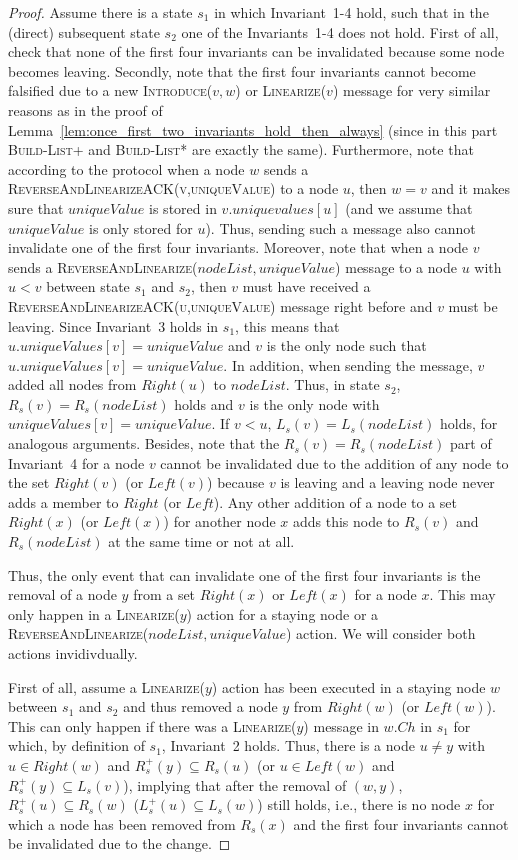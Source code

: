 \documentclass[a4paper,USenglish]{lipics}
\newcommand{\blp}{\textsc{Build-List+}\xspace}
\newcommand{\blpp}{\textsc{Build-List*}\xspace}
\newcommand{\linearize}[1]{\textsc{Linearize(\ensuremath{#1})}\xspace}
\newcommand{\introduce}[1]{\textsc{Introduce(\ensuremath{#1})}\xspace}
\newcommand{\rsp}{\ensuremath{R_s^+}\xspace}
\newcommand{\lsp}{\ensuremath{L_s^+}\xspace}
\newcommand{\revandlin}[1]{\textsc{ReverseAndLinearize(\ensuremath{#1})}\xspace} \newcommand{\revandlinREQ}[1]{\textsc{ReverseAndLinearizeREQ(#1)}\xspace}
\newcommand{\revandlinACK}[1]{\textsc{ReverseAndLinearizeACK(#1)}\xspace}
\begin{document}
\begin{proof}
 Assume there is a state $s_1$ in which Invariant~1-4 hold, such that in the (direct) subsequent state $s_2$ one of the Invariants~1-4 does not hold.
 First of all, check that none of the first four invariants can be invalidated because some node becomes leaving.
 Secondly, note that the first four invariants cannot become falsified due to a new \introduce{v,w} or \linearize{v} message for very similar reasons as in the proof of Lemma~\ref{lem:once_first_two_invariants_hold_then_always} (since in this part \blp and \blpp are exactly the same).
 Furthermore, note that according to the protocol when a node $w$ sends a \revandlinACK{v,uniqueValue} to a node $u$, then $w=v$ and it makes sure that $uniqueValue$ is stored in $v.uniquevalues[u]$ (and we assume that $uniqueValue$ is only stored for $u$).
 Thus, sending such a message also cannot invalidate one of the first four invariants.
 Moreover, note that when a node $v$ sends a \revandlin{nodeList,uniqueValue} message to a node $u$ with $u < v$ between state $s_1$ and $s_2$, then $v$ must have received a \revandlinACK{u,uniqueValue} message right before and $v$ must be leaving.
 Since Invariant~3 holds in $s_1$, this means that $u.uniqueValues[v] = uniqueValue$ and $v$ is the only node such that $u.uniqueValues[v] = uniqueValue$.
 In addition, when sending the message, $v$ added all nodes from $Right(u)$ to $nodeList$.
 Thus, in state $s_2$, $R_s(v) = R_s(nodeList)$ holds and $v$ is the only node with $uniqueValues[v] = uniqueValue$.
 If $v < u$, $L_s(v) = L_s(nodeList)$ holds, for analogous arguments.
 Besides, note that the $R_s(v) = R_s(nodeList)$ part of Invariant~4 for a node $v$ cannot be invalidated due to the addition of any node to the set $Right(v)$ (or $Left(v)$) because $v$ is leaving and a leaving node never adds a member to $Right$ (or $Left$).
 Any other addition of a node to a set $Right(x)$ (or $Left(x)$) for another node $x$ adds this node to $R_s(v)$ and $R_s(nodeList)$ at the same time or not at all.
 
 Thus, the only event that can invalidate one of the first four invariants is the removal of a node $y$ from a set $Right(x)$ or $Left(x)$ for a node $x$.
 This may only happen in a \linearize{y} action for a staying node or a \revandlin{nodeList, uniqueValue} action.
    We will consider both actions invidivdually.
    
    First of all, assume a \linearize{y} action has been executed in a staying node $w$ between $s_1$ and $s_2$ and thus removed a node $y$ from $Right(w)$ (or $Left(w)$).
    This can only happen if there was a \linearize{y} message in $w.Ch$ in $s_1$ for which, by definition of $s_1$, Invariant~2 holds.
    Thus, there is a node $u \neq y$ with $u \in Right(w)$ and $\rsp(y) \subseteq R_s(u)$ (or $u \in Left(w)$ and $\rsp(y) \subseteq L_s(v)$), implying that after the removal of $(w,y)$, $\rsp(u) \subseteq R_s(w)$ ($\lsp(u) \subseteq L_s(w)$) still holds, i.e., there is no node $x$ for which a node has been removed from $R_s(x)$ and the first four invariants cannot be invalidated due to the change.
 

\end{proof}
\end{document}
